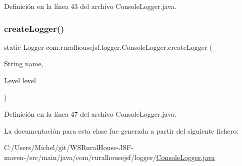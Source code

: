 Definición en la línea 43 del archivo Console\+Logger.\+java.

\mbox{\label{classcom_1_1ruralhousejsf_1_1logger_1_1_console_logger_ab24910a5c796c6dd0a686067a856febd}} 
\subsubsection{\texorpdfstring{createLogger()}{createLogger()}\hspace{0.1cm}{\footnotesize\ttfamily [6/6]}}
{\footnotesize\ttfamily static Logger com.\+ruralhousejsf.\+logger.\+Console\+Logger.\+create\+Logger (\begin{DoxyParamCaption}\item[{String}]{name,  }\item[{Level}]{level }\end{DoxyParamCaption})\hspace{0.3cm}{\ttfamily [static]}}



Definición en la línea 47 del archivo Console\+Logger.\+java.



La documentación para esta clase fue generada a partir del siguiente fichero\+:\begin{DoxyCompactItemize}
\item 
C\+:/\+Users/\+Michel/git/\+W\+S\+Rural\+House-\/\+J\+S\+F-\/maven-\//src/main/java/com/ruralhousejsf/logger/\mbox{\hyperlink{_console_logger_8java}{Console\+Logger.\+java}}\end{DoxyCompactItemize}
